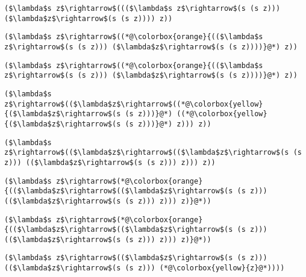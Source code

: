 \documentclass{beamer}
\begin{document}
\begin{frame}[fragile]{\CurrentSection}
\lstset{basicstyle=\ttfamily\small}\lstset{numbers=none}\lstset{language=ML}\begin{lstlisting}
($\lambda$s z$\rightarrow$((($\lambda$s z$\rightarrow$(s (s z))) ($\lambda$z$\rightarrow$(s (s z)))) z))
\end{lstlisting}
\pause\lstset{language=ML}\begin{lstlisting}
($\lambda$s z$\rightarrow$((*@\colorbox{orange}{(($\lambda$s z$\rightarrow$(s (s z))) ($\lambda$z$\rightarrow$(s (s z))))}@*) z))
\end{lstlisting}

\end{frame}

\begin{frame}[fragile]{\CurrentSection}
\lstset{basicstyle=\ttfamily\small}\lstset{numbers=none}\lstset{language=ML}\begin{lstlisting}
($\lambda$s z$\rightarrow$((*@\colorbox{orange}{(($\lambda$s z$\rightarrow$(s (s z))) ($\lambda$z$\rightarrow$(s (s z))))}@*) z))
\end{lstlisting}
\pause\lstset{language=ML}\begin{lstlisting}
($\lambda$s z$\rightarrow$(($\lambda$z$\rightarrow$((*@\colorbox{yellow}{($\lambda$z$\rightarrow$(s (s z)))}@*) ((*@\colorbox{yellow}{($\lambda$z$\rightarrow$(s (s z)))}@*) z))) z))
\end{lstlisting}

\end{frame}

\begin{frame}[fragile]{\CurrentSection}
\lstset{basicstyle=\ttfamily\small}\lstset{numbers=none}\lstset{language=ML}\begin{lstlisting}
($\lambda$s z$\rightarrow$(($\lambda$z$\rightarrow$(($\lambda$z$\rightarrow$(s (s z))) (($\lambda$z$\rightarrow$(s (s z))) z))) z))
\end{lstlisting}
\pause\lstset{language=ML}\begin{lstlisting}
($\lambda$s z$\rightarrow$(*@\colorbox{orange}{(($\lambda$z$\rightarrow$(($\lambda$z$\rightarrow$(s (s z))) (($\lambda$z$\rightarrow$(s (s z))) z))) z)}@*))
\end{lstlisting}

\end{frame}

\begin{frame}[fragile]{\CurrentSection}
\lstset{basicstyle=\ttfamily\small}\lstset{numbers=none}\lstset{language=ML}\begin{lstlisting}
($\lambda$s z$\rightarrow$(*@\colorbox{orange}{(($\lambda$z$\rightarrow$(($\lambda$z$\rightarrow$(s (s z))) (($\lambda$z$\rightarrow$(s (s z))) z))) z)}@*))
\end{lstlisting}
\pause\lstset{language=ML}\begin{lstlisting}
($\lambda$s z$\rightarrow$(($\lambda$z$\rightarrow$(s (s z))) (($\lambda$z$\rightarrow$(s (s z))) (*@\colorbox{yellow}{z}@*))))
\end{lstlisting}

\end{frame}
\end{document}
